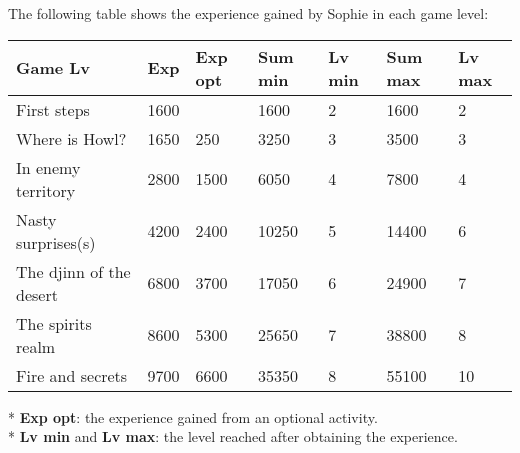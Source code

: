 The following table shows the experience gained by Sophie in each game level:
\begin{table}[H]
\centering
\begin{tabular}{|p{4cm}|l|l|l|l|l|l|}
\hline
\rowcolor[HTML]{C0C0C0} 
\textbf{Game Lv} & \textbf{Exp} & \textbf{Exp opt} & \textbf{Sum min} & \textbf{Lv min} & \textbf{Sum max} & \textbf{Lv max} \\ \hline
First steps & 1600 &  & 1600 & 2 & 1600 & 2 \\ \hline
Where is Howl? & 1650 & 250 & 3250 & 3 & 3500 & 3 \\ \hline
In enemy territory & 2800 & 1500 & 6050 & 4 & 7800 & 4 \\ \hline
Nasty surprises(s) & 4200 & 2400 & 10250 & 5 & 14400 & 6 \\ \hline
The djinn of the desert & 6800 & 3700 & 17050 & 6 & 24900 & 7 \\ \hline
The spirits realm & 8600 & 5300 & 25650 & 7 & 38800 & 8 \\ \hline
Fire and secrets & 9700 & 6600 & 35350 & 8 & 55100 & 10 \\ \hline
\end{tabular}
\end{table}
* \textbf{Exp opt}: the experience gained from an optional activity. \\
* \textbf{Lv min} and \textbf{Lv max}: the level reached after obtaining the experience.

